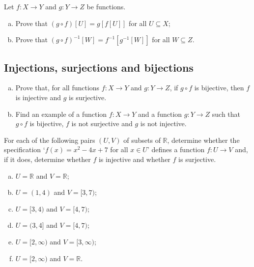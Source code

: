 \begin{chapex}
Let $f : X \to Y$ and $g : Y \to Z$ be functions.
\begin{enumerate}[(a)]
\item Prove that $(g \circ f)[U] = g[f[U]]$ for all $U \subseteq X$;
\item Prove that $(g \circ f)^{-1}[W] = f^{-1}[g^{-1}[W]]$ for all $W \subseteq Z$.
\end{enumerate}
\end{chapex}

\subsection*{Injections, surjections and bijections}

\begin{chapex}
\begin{enumerate}[(a)]
\item Prove that, for all functions $f : X \to Y$ and $g : Y \to Z$, if $g \circ f$ is bijective, then $f$ is injective and $g$ is surjective.
\item Find an example of a function $f : X \to Y$ and a function $g : Y \to Z$ such that $g \circ f$ is bijective, $f$ is not surjective and $g$ is not injective.
\end{enumerate}
\end{chapex}

\begin{chapex}
\label{cqInjectionSurjectionBijection}
For each of the following pairs $(U,V)$ of subsets of $\mathbb{R}$, determine whether the specification `$f(x) = x^2-4x+7$ for all $x \in U$' defines a function $f : U \to V$ and, if it does, determine whether $f$ is injective and whether $f$ is surjective.
\begin{multicols}{2}
\begin{enumerate}[(a)]
\item $U = \mathbb{R}$ and $V = \mathbb{R}$;
\item $U = (1, 4)$ and $V = [3, 7)$;
\item $U = [3, 4)$ and $V = [4, 7)$;
\item $U = (3, 4]$ and $V = [4, 7)$;
\item $U = [2, \infty)$ and $V = [3, \infty)$;
\item $U = [2,\infty)$ and $V = \mathbb{R}$.
\end{enumerate}
\end{multicols}
\end{chapex}

